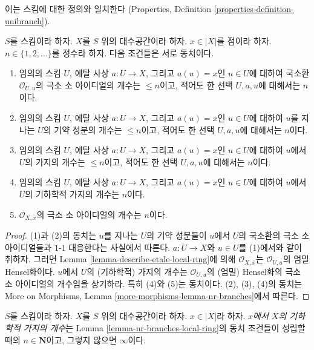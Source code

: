 \noindent
이는 스킴에 대한 정의와 일치한다
(Properties, Definition \ref{properties-definition-unibranch}).

\begin{lemma}
\label{lemma-nr-branches-local-ring}
$S$를 스킴이라 하자. $X$를 $S$ 위의 대수공간이라 하자.
$x \in |X|$를 점이라 하자.
$n \in \{1, 2, \ldots\}$를 정수라 하자.
다음 조건들은 서로 동치이다.
\begin{enumerate}
\item 임의의 스킴 $U$, 에탈 사상 $a : U \to X$, 그리고
$a(u) = x$인 $u \in U$에 대하여 국소환
$\mathcal{O}_{U, u}$의 극소 소 아이디얼의 개수는 $\leq n$이고,
적어도 한 선택 $U, a, u$에 대해서는 $n$이다.
\item 임의의 스킴 $U$, 에탈 사상 $a : U \to X$, 그리고
$a(u) = x$인 $u \in U$에 대하여
$u$를 지나는 $U$의 기약 성분의 개수는 $\leq n$이고,
적어도 한 선택 $U, a, u$에 대해서는 $n$이다.
\item 임의의 스킴 $U$, 에탈 사상 $a : U \to X$, 그리고
$a(u) = x$인 $u \in U$에 대하여 $u$에서 $U$의 가지의 개수는
$\leq n$이고, 적어도 한 선택 $U, a, u$에 대해서는 $n$이다.
\item 임의의 스킴 $U$, 에탈 사상 $a : U \to X$, 그리고
$a(u) = x$인 $u \in U$에 대하여 $u$에서 $U$의 기하학적 가지의
개수는 $n$이다.
\item
$\mathcal{O}_{X, \overline{x}}$의 극소 소 아이디얼의 개수는 $n$이다.
\end{enumerate}
\end{lemma}

\begin{proof}
(1)과 (2)의 동치는 $u$를 지나는 $U$의 기약 성분들이
$u$에서 $U$의 국소환의 극소 소 아이디얼들과 $1$-$1$ 대응한다는
사실에서 따른다. $a : U \to X$와 $u \in U$를 (1)에서와 같이
취하자. 그러면 Lemma \ref{lemma-describe-etale-local-ring}에 의해
$\mathcal{O}_{X, \overline{x}}$는 $\mathcal{O}_{U, u}$의
엄밀 Hensel화이다. $u$에서 $U$의 (기하학적) 가지의 개수는
$\mathcal{O}_{U, u}$의 (엄밀) Hensel화의 극소 소 아이디얼의
개수임을 상기하라. 특히 (4)와 (5)는 동치이다.
(2), (3), (4)의 동치는 More on Morphisms, Lemma
\ref{more-morphisms-lemma-nr-branches}에서 따른다.
\end{proof}

\begin{definition}
\label{definition-number-of-geometric-branches}
$S$를 스킴이라 하자.
$X$를 $S$ 위의 대수공간이라 하자.
$x \in |X|$라 하자. {\it $x$에서 $X$의 기하학적 가지의 개수}는
Lemma \ref{lemma-nr-branches-local-ring}의 동치 조건들이 성립할 때의
$n \in \mathbf{N}$이고, 그렇지 않으면 $\infty$이다.
\end{definition}


